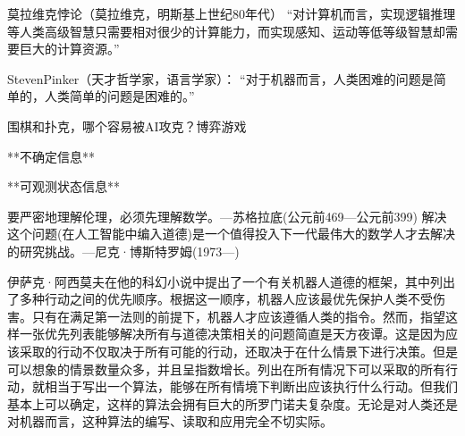 莫拉维克悖论（莫拉维克，明斯基上世纪80年代）
“对计算机而言，实现逻辑推理等人类高级智慧只需要相对很少的计算能力，而实现感知、运动等低等级智慧却需要巨大的计算资源。”

StevenPinker（天才哲学家，语言学家）：
“对于机器而言，人类困难的问题是简单的，人类简单的问题是困难的。”






围棋和扑克，哪个容易被AI攻克？博弈游戏



**不确定信息**



**可观测状态信息**



要严密地理解伦理，必须先理解数学。---苏格拉底(公元前469—公元前399)
解决这个问题(在人工智能中编入道德)是一个值得投入下一代最伟大的数学人才去解决的研究挑战。---尼克·博斯特罗姆(1973—)



伊萨克·阿西莫夫在他的科幻小说中提出了一个有关机器人道德的框架，其中列出了多种行动之间的优先顺序。根据这一顺序，机器人应该最优先保护人类不受伤害。只有在满足第一法则的前提下，机器人才应该遵循人类的指令。然而，指望这样一张优先列表能够解决所有与道德决策相关的问题简直是天方夜谭。这是因为应该采取的行动不仅取决于所有可能的行动，还取决于在什么情景下进行决策。但是可以想象的情景数量众多，并且呈指数增长。列出在所有情况下可以采取的所有行动，就相当于写出一个算法，能够在所有情境下判断出应该执行什么行动。但我们基本上可以确定，这样的算法会拥有巨大的所罗门诺夫复杂度。无论是对人类还是对机器而言，这种算法的编写、读取和应用完全不切实际。



